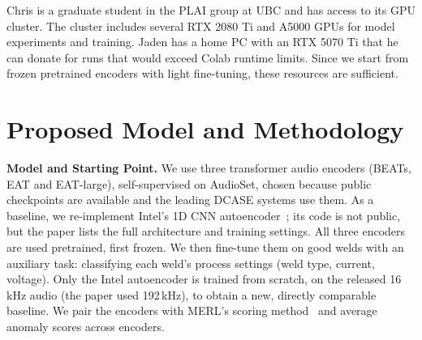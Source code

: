 \documentclass[11pt]{article}
\begin{document}
Chris is a graduate student in the PLAI group at UBC and has access to its GPU cluster. The cluster includes several RTX 2080 Ti and A5000 GPUs for model experiments and training. Jaden has a home PC with an RTX 5070 Ti that he can donate for runs that would exceed Colab runtime limits. Since we start from frozen pretrained encoders with light fine-tuning, these resources are sufficient.

\section{Proposed Model and Methodology}


{\bf Model and Starting Point.}
We use three transformer audio encoders (BEATs, EAT and EAT-large), self-supervised on AudioSet, chosen because public checkpoints are available and the leading DCASE systems use them. As a baseline, we re-implement Intel's 1D CNN autoencoder~\cite{intel}; its code is not public, but the paper lists the full architecture and training settings.
All three encoders are used pretrained, first frozen.
We then fine-tune them on good welds with an auxiliary task: classifying each weld's process settings (weld type, current, voltage).
Only the Intel autoencoder is trained from scratch, on the released 16\,kHz audio (the paper used 192\,kHz), to obtain a new, directly comparable baseline.
We pair the encoders with MERL's scoring method~\cite{merl} and average anomaly scores across encoders.
\end{document}

